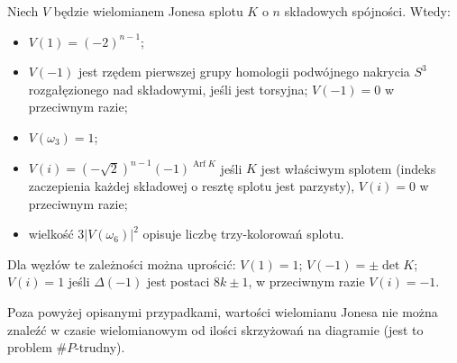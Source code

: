 \begin{proposition} \label{jones_sharp_p_hard}
	Niech $V$ będzie wielomianem Jonesa splotu $K$ o $n$ składowych spójności.
	Wtedy:
	\begin{itemize}
		\item $V(1) = (-2)^{n-1}$;
		\item $V(-1)$ jest rzędem pierwszej grupy homologii podwójnego nakrycia $S^3$ rozgałęzionego nad składowymi, jeśli jest torsyjna; $V(-1) = 0$ w przeciwnym razie;
		\item $V(\omega_3) = 1$;
		\item $V(i) = (-\sqrt 2)^{n-1}(-1)^{\operatorname{Arf} K}$ jeśli $K$ jest właściwym splotem (indeks zaczepienia każdej składowej o resztę splotu jest parzysty), $V(i) = 0$ w przeciwnym razie;
		\item wielkość $3|V(\omega_6)|^2$ opisuje liczbę trzy-kolorowań splotu.
	\end{itemize}
	Dla węzłów te zależności można uprościć: $V(1) = 1$; $V(-1) = \pm \det K$; $V(i) = 1$ jeśli $\Delta(-1)$ jest postaci $8k \pm 1$, w przeciwnym razie $V(i) = -1$.
\end{proposition}

Poza powyżej opisanymi przypadkami, wartości wielomianu Jonesa nie można znaleźć w czasie wielomianowym od ilości skrzyżowań na diagramie (jest to problem $\#P$-trudny).

